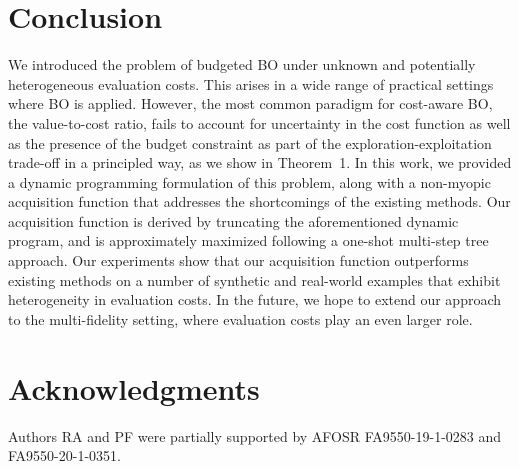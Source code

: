 \section{Conclusion}
\label{sec:conclusion}
We introduced the problem of budgeted BO under unknown and potentially heterogeneous evaluation costs. This arises in a wide range of practical settings where BO is applied. However, the most common paradigm for cost-aware BO, the value-to-cost ratio, fails to account for uncertainty in the cost function as well as the presence of the budget constraint as part of the exploration-exploitation trade-off in a principled way, as we show in Theorem~1. In this work, we provided a dynamic programming formulation of this problem, along with a non-myopic acquisition function that addresses the shortcomings of the existing methods. Our acquisition function is derived by truncating the aforementioned dynamic program, and is approximately maximized following a one-shot multi-step tree approach. Our experiments show that our acquisition function outperforms existing methods on a number of synthetic and real-world examples that exhibit heterogeneity in evaluation costs. In the future, we hope to extend our approach to the multi-fidelity setting, where evaluation costs play an even larger role.

\section*{Acknowledgments}
Authors RA and PF were partially supported by AFOSR FA9550-19-1-0283 and FA9550-20-1-0351.